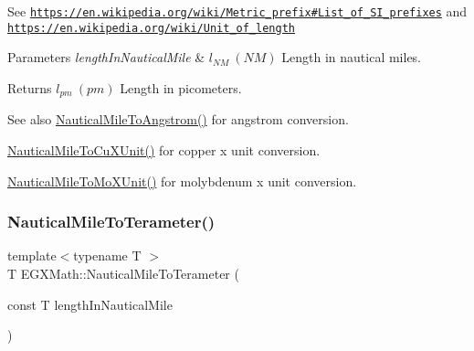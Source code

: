 See \href{https://en.wikipedia.org/wiki/Metric_prefix#List_of_SI_prefixes}{\tt https\+://en.\+wikipedia.\+org/wiki/\+Metric\+\_\+prefix\#\+List\+\_\+of\+\_\+\+S\+I\+\_\+prefixes} and \href{https://en.wikipedia.org/wiki/Unit_of_length}{\tt https\+://en.\+wikipedia.\+org/wiki/\+Unit\+\_\+of\+\_\+length} 
\begin{DoxyParams}{Parameters}
{\em length\+In\+Nautical\+Mile} & $ l_{NM}\ (NM)$ Length in nautical miles. \\
\hline
\end{DoxyParams}
\begin{DoxyReturn}{Returns}
$ l_{pm}\ (pm)$ Length in picometers. 
\end{DoxyReturn}
\begin{DoxySeeAlso}{See also}
\mbox{\hyperlink{group___e_g_x_math-_conversions-_length_conversions-_nautical-_nautical_mile-_non-_s_i_ga6f451e4456d985c7d63b39a084b3dd23}{Nautical\+Mile\+To\+Angstrom()}} for angstrom conversion. 

\mbox{\hyperlink{group___e_g_x_math-_conversions-_length_conversions-_nautical-_nautical_mile-_non-_s_i_gaa0638917756d520cfc0877dcde60d777}{Nautical\+Mile\+To\+Cu\+X\+Unit()}} for copper x unit conversion. 

\mbox{\hyperlink{group___e_g_x_math-_conversions-_length_conversions-_nautical-_nautical_mile-_non-_s_i_ga17cfe98568d00c2e0b1c0b5d19f1b34e}{Nautical\+Mile\+To\+Mo\+X\+Unit()}} for molybdenum x unit conversion. 
\end{DoxySeeAlso}
\mbox{\label{group___e_g_x_math-_conversions-_length_conversions-_nautical-_nautical_mile-_s_i_gabd27057118659d507b698fc258ee5200}} 
\subsubsection{\texorpdfstring{Nautical\+Mile\+To\+Terameter()}{NauticalMileToTerameter()}}
{\footnotesize\ttfamily template$<$typename T $>$ \\
T E\+G\+X\+Math\+::\+Nautical\+Mile\+To\+Terameter (\begin{DoxyParamCaption}\item[{const T}]{length\+In\+Nautical\+Mile }\end{DoxyParamCaption})}



